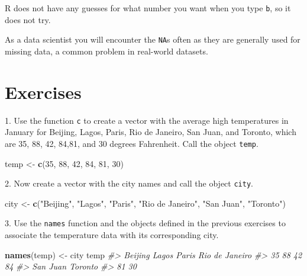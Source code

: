 \documentclass[
]{krantz}
\newenvironment{Shaded}{\begin{snugshade}}{\end{snugshade}}
\newcommand{\CommentTok}[1]{\textcolor[rgb]{0.37,0.37,0.37}{\textit{#1}}}
\newcommand{\DecValTok}[1]{\textcolor[rgb]{0.06,0.06,0.06}{#1}}
\newcommand{\KeywordTok}[1]{\textcolor[rgb]{0.27,0.27,0.27}{\textbf{#1}}}
\newcommand{\NormalTok}[1]{#1}
\newcommand{\StringTok}[1]{\textcolor[rgb]{0.5,0.5,0.5}{#1}}
\begin{document}
R does not have any guesses for what number you want when you type \texttt{b}, so it does not try.

As a data scientist you will encounter the \texttt{NA}s often as they are generally used for missing data, a common problem in real-world datasets.

\hypertarget{exercises-2}{%
\section{Exercises}\label{exercises-2}}

1. Use the function \texttt{c} to create a vector with the average high temperatures in January for Beijing, Lagos, Paris, Rio de Janeiro, San Juan, and Toronto, which are 35, 88, 42, 84,81, and 30 degrees Fahrenheit. Call the object \texttt{temp}.

\begin{Shaded}
\begin{Highlighting}[]
\NormalTok{temp <-}\StringTok{ }\KeywordTok{c}\NormalTok{(}\DecValTok{35}\NormalTok{, }\DecValTok{88}\NormalTok{, }\DecValTok{42}\NormalTok{, }\DecValTok{84}\NormalTok{, }\DecValTok{81}\NormalTok{, }\DecValTok{30}\NormalTok{)}
\end{Highlighting}
\end{Shaded}

2. Now create a vector with the city names and call the object \texttt{city}.

\begin{Shaded}
\begin{Highlighting}[]
\NormalTok{city <-}\StringTok{ }\KeywordTok{c}\NormalTok{(}\StringTok{"Beijing"}\NormalTok{, }\StringTok{"Lagos"}\NormalTok{, }\StringTok{"Paris"}\NormalTok{, }\StringTok{"Rio de Janeiro"}\NormalTok{, }\StringTok{"San Juan"}\NormalTok{, }\StringTok{"Toronto"}\NormalTok{)}
\end{Highlighting}
\end{Shaded}

3. Use the \texttt{names} function and the objects defined in the previous exercises to associate the temperature data with its corresponding city.

\begin{Shaded}
\begin{Highlighting}[]
\KeywordTok{names}\NormalTok{(temp) <-}\StringTok{ }\NormalTok{city}
\NormalTok{temp}
\CommentTok{#>        Beijing          Lagos          Paris Rio de Janeiro }
\CommentTok{#>             35             88             42             84 }
\CommentTok{#>       San Juan        Toronto }
\CommentTok{#>             81             30}
\end{Highlighting}
\end{Shaded}
\end{document}
